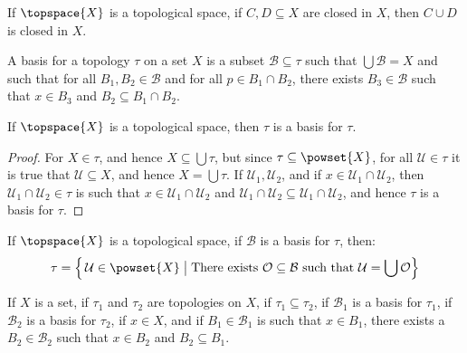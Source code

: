 \documentclass{book}                                                           %
\begin{document}
            \begin{theorem}
                If $\topspace{X}$ is a topological space, if $C,D\subseteq{X}$ are
                closed in $X$, then $C\cup{D}$ is closed in $X$.
            \end{theorem}
            \begin{definition}
                A basis for a topology $\tau$ on a set $X$ is a subset
                $\mathcal{B}\subseteq\tau$ such that $\bigcup\mathcal{B}=X$ and such
                that for all $B_{1},B_{2}\in\mathcal{B}$ and for all
                $p\in{B}_{1}\cap{B}_{2}$, there exists $B_{3}\in\mathcal{B}$ such
                that $x\in{B}_{3}$ and $B_{2}\subseteq{B}_{1}\cap{B}_{2}$.
            \end{definition}
            \begin{theorem}
                If $\topspace{X}$ is a topological space, then $\tau$ is a basis
                for $\tau$.
            \end{theorem}
            \begin{proof}
                For $X\in\tau$, and hence $X\subseteq\bigcup\tau$, but since
                $\tau\subseteq\powset{X}$, for all $\mathcal{U}\in\tau$ it is true
                that $\mathcal{U}\subseteq{X}$, and hence $X=\bigcup\tau$. If
                $\mathcal{U}_{1},\mathcal{U}_{2}$, and if
                $x\in\mathcal{U}_{1}\cap\mathcal{U}_{2}$, then
                $\mathcal{U}_{1}\cap\mathcal{U}_{2}\in\tau$ is such that
                $x\in\mathcal{U}_{1}\cap\mathcal{U}_{2}$ and
                $\mathcal{U}_{1}\cap\mathcal{U}_{2}\subseteq%
                 \mathcal{U}_{1}\cap\mathcal{U}_{2}$, and hence $\tau$ is a basis
                for $\tau$.
            \end{proof}
            \begin{theorem}
                If $\topspace{X}$ is a topological space, if $\mathcal{B}$ is a
                basis for $\tau$, then:
                \begin{equation}
                    \tau=\Big\{\,\mathcal{U}\in\powset{X}\;\big|\;
                        \textrm{There exists }\mathcal{O}\subseteq\mathcal{B}
                        \textrm{ such that }\mathcal{U}=\bigcup\mathcal{O}\Big\}
                \end{equation}
            \end{theorem}
            \begin{theorem}
                If $X$ is a set, if $\tau_{1}$ and $\tau_{2}$ are topologies on $X$,
                if $\tau_{1}\subseteq\tau_{2}$, if $\mathcal{B}_{1}$ is a basis for
                $\tau_{1}$, if $\mathcal{B}_{2}$ is a basis for $\tau_{2}$, if
                $x\in{X}$, and if $B_{1}\in\mathcal{B}_{1}$ is such that
                $x\in{B}_{1}$, there exists a $B_{2}\in\mathcal{B}_{2}$ such that
                $x\in{B}_{2}$ and $B_{2}\subseteq{B}_{1}$.
            \end{theorem}
\end{document}
